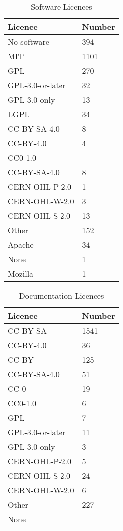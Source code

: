 \documentclass[final-report.tex]{subfiles}
\begin{document}
\begin{table*}[h!]
        \centering
        \begin{tabular}{| l | l |}
        \toprule
            Licence & Number \\
        \midrule
        \midrule
            No software & 394 \\
        \midrule
            MIT & 1101 \\
        \midrule
            GPL & 270 \\
            GPL-3.0-or-later & 32 \\
            GPL-3.0-only & 13 \\
            LGPL & 34 \\
        \midrule
            CC-BY-SA-4.0 & 8 \\
            CC-BY-4.0 & 4 \\
            CC0-1.0 &  \\
            CC-BY-SA-4.0 & 8 \\
        \midrule
            CERN-OHL-P-2.0 & 1 \\
            CERN-OHL-W-2.0 & 3 \\
            CERN-OHL-S-2.0 & 13 \\
        \midrule
            Other & 152 \\
            Apache & 34 \\
            None & 1 \\
            Mozilla & 1 \\
        \bottomrule
        \end{tabular}
        \caption{Software Licences}
        \label{tab:slic}
\end{table*}

\begin{table*}[h!]
        \centering
        \begin{tabular}{| l | l |}
        \toprule
                Licence & Number \\
        \midrule
        \midrule
            CC BY-SA & 1541 \\
            CC-BY-4.0 & 36 \\
            CC BY & 125 \\
            CC-BY-SA-4.0 & 51 \\
            CC 0 & 19 \\
            CC0-1.0 & 6 \\
        \midrule
            GPL & 7 \\
            GPL-3.0-or-later & 11 \\
            GPL-3.0-only & 3 \\
        \midrule
            CERN-OHL-P-2.0 & 5 \\
            CERN-OHL-S-2.0 & 24 \\
            CERN-OHL-W-2.0 & 6 \\
            Other & 227 \\
            None &  \\
        \bottomrule
        \end{tabular}
        \caption{Documentation Licences}
        \label{tab:dlic}
\end{table*}
\end{document}
